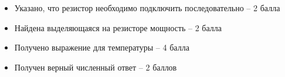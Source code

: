 \begin{enumerate}
    \markSection
    
    \begin{itemize}
        \item Указано, что резистор необходимо подключить последовательно  – 2 балла 
        \item Найдена выделяющаяся на резисторе мощность – 2 балла
        \item Получено выражение для температуры – 4 балла
        \item Получен верный численный ответ – 2 баллов 
    \end{itemize}
\end{enumerate}
